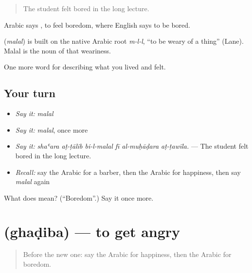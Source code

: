 \begin{quote}
The student felt bored in the long lecture.
\end{quote}

Arabic says  , to feel boredom, where English says to be bored.

\begin{cousinweb}
\textbf{} (\emph{malal}) is built on the native Arabic root \emph{m-l-l}, \textquotedblleft{}to be weary of a thing\textquotedblright{} (Lane). Malal is the noun of that weariness.
\end{cousinweb}

\begin{grammarlens}[title={What you've built}]
One more word for describing what you lived and felt.
\end{grammarlens}

\subsection*{Your turn}
\begin{itemize}
\raggedright
  \item \emph{Say it:} \emph{malal}
  \item \emph{Say it:} \emph{malal}, once more
  \item \emph{Say it:} \emph{shaʿara aṭ-ṭālib bi-l-malal fī al-muḥāḍara aṭ-ṭawīla.} — The student felt bored in the long lecture.
  \item \emph{Recall:} say the Arabic for a barber, then the Arabic for happiness, then say \emph{malal} again
\end{itemize}

\begin{tcolorbox}[breakable,colback=teal!4,colframe=teal!35!black,title={Before you move on}]
What does  mean? (\textquotedblleft{}Boredom\textquotedblright{}.) Say it once more.
\end{tcolorbox}
\section[\texorpdfstring{\ar{غضب} (ghaḍiba)}{غضب (ghaḍiba)}]{ (ghaḍiba) — to get angry}

\label{lesson:AR-C488-ghadiba}



\begin{quote}
Before the new one: say the Arabic for happiness, then the Arabic for boredom.
\end{quote}

